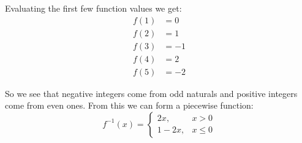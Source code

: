 \documentclass{article}
\begin{document}
Evaluating the first few function values we get:
\begin{align*}
  f(1) & = 0  \\
  f(2) & = 1  \\
  f(3) & = -1 \\
  f(4) & = 2  \\
  f(5) & = -2
\end{align*}

So we see that negative integers come from odd naturals and positive integers come from even ones. From this we can form a piecewise function:
$$f^{-1}(x) = \begin{cases}
    2x,     & x > 0    \\
    1 - 2x, & x \leq 0
  \end{cases}$$
\end{document}
